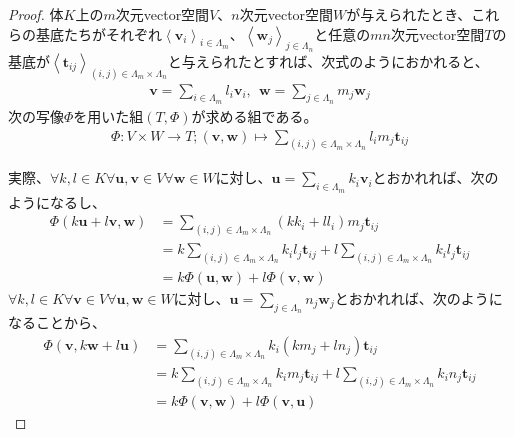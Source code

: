 \documentclass[dvipdfmx]{jsarticle}
\begin{document}
\begin{proof}
体$K$上の$m$次元vector空間$V$、$n$次元vector空間$W$が与えられたとき、これらの基底たちがそれぞれ$\left\langle \mathbf{v}_{i} \right\rangle_{i \in \varLambda_{m}}$、$\left\langle \mathbf{w}_{j} \right\rangle_{j \in \varLambda_{n}}$と任意の$mn$次元vector空間$T$の基底が$\left\langle \mathbf{t}_{ij} \right\rangle_{(i,j) \in \varLambda_{m} \times \varLambda_{n}}$と与えられたとすれば、次式のようにおかれると、
\begin{align*}
\mathbf{v} = \sum_{i \in \varLambda_{m}} {l_{i}\mathbf{v}_{i}},\ \ \mathbf{w} = \sum_{j \in \varLambda_{n}} {m_{j}\mathbf{w}_{j}}
\end{align*}
次の写像$\varPhi$を用いた組$(T,\varPhi)$が求める組である。
\begin{align*}
\varPhi:V \times W \rightarrow T;\left( \mathbf{v},\mathbf{w} \right) \mapsto \sum_{(i,j) \in \varLambda_{m} \times \varLambda_{n}} {l_{i}m_{j}\mathbf{t}_{ij}}
\end{align*}\par
実際、$\forall k,l \in K\forall\mathbf{u},\mathbf{v} \in V\forall\mathbf{w} \in W$に対し、$\mathbf{u} = \sum_{i \in \varLambda_{m}} {k_{i}\mathbf{v}_{i}}$とおかれれば、次のようになるし、
\begin{align*}
\varPhi\left( k\mathbf{u} + l\mathbf{v},\mathbf{w} \right) &= \sum_{(i,j) \in \varLambda_{m} \times \varLambda_{n}} {\left( kk_{i} + ll_{i} \right)m_{j}\mathbf{t}_{ij}}\\
&= k\sum_{(i,j) \in \varLambda_{m} \times \varLambda_{n}} {k_{i}l_{j}\mathbf{t}_{ij}} + l\sum_{(i,j) \in \varLambda_{m} \times \varLambda_{n}} {k_{i}l_{j}\mathbf{t}_{ij}}\\
&= k\varPhi\left( \mathbf{u},\mathbf{w} \right) + l\varPhi\left( \mathbf{v},\mathbf{w} \right)
\end{align*}
$\forall k,l \in K\forall\mathbf{v} \in V\forall\mathbf{u},\mathbf{w} \in W$に対し、$\mathbf{u} = \sum_{j \in \varLambda_{n}} {n_{j}\mathbf{w}_{j}}$とおかれれば、次のようになることから、
\begin{align*}
\varPhi\left( \mathbf{v},k\mathbf{w} + l\mathbf{u} \right) &= \sum_{(i,j) \in \varLambda_{m} \times \varLambda_{n}} {k_{i}\left( km_{j} + ln_{j} \right)\mathbf{t}_{ij}}\\
&= k\sum_{(i,j) \in \varLambda_{m} \times \varLambda_{n}} {k_{i}m_{j}\mathbf{t}_{ij}} + l\sum_{(i,j) \in \varLambda_{m} \times \varLambda_{n}} {k_{i}n_{j}\mathbf{t}_{ij}}\\
&= k\varPhi\left( \mathbf{v},\mathbf{w} \right) + l\varPhi\left( \mathbf{v},\mathbf{u} \right)

\end{align*}
\end{proof}
\end{document}
